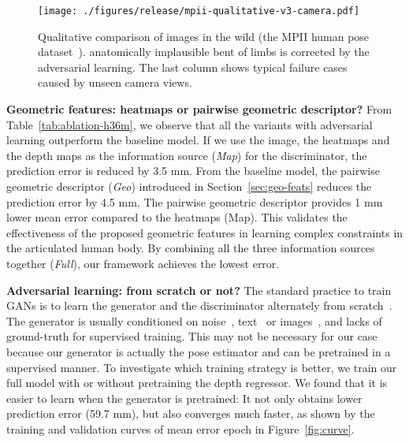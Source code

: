 \documentclass[10pt,twocolumn,letterpaper]{article}
\newcommand{\smalltitle}[1]{\vspace{0.2em}\noindent \textbf{{#1}}}
\begin{document}
\begin{figure*}[t]
	\begin{center}
		\texttt{[image: ./figures/release/mpii-qualitative-v3-camera.pdf]}
	\end{center}
	\vspace{-1em}
	\caption{Qualitative comparison of images in the wild (\ie the MPII human pose dataset~\cite{andriluka20142d}). 
		anatomically implausible bent of limbs is corrected by the adversarial learning. 
		The last column shows typical failure cases caused by unseen camera views. 
	}
	\vspace{-1em}
	\label{fig:mpii}
\end{figure*}

\smalltitle{Geometric features: heatmaps or pairwise geometric descriptor?} 
From Table~\ref{tab:ablation-h36m}, we observe that all the variants with adversarial learning outperform the baseline model. 
If we use the image, the heatmaps and the depth maps as the information source (\textit{Map}) for the discriminator, the prediction error is reduced by 3.5 mm. 
From the baseline model, the pairwise geometric descriptor (\textit{Geo}) introduced in Section~\ref{sec:geo-feats} reduces the prediction error by 4.5 mm. The pairwise geometric descriptor provides 1 mm lower mean error compared to the heatmaps (Map).  
This validates the effectiveness of the proposed geometric features in learning complex constraints in the articulated human body. 
By combining all the three information sources together (\textit{Full}), our framework achieves the lowest error.









\smalltitle{Adversarial learning: from scratch or not? }
The standard practice to train GANs is to learn the generator and the discriminator alternately from scratch~\cite{goodfellow2014generative,radford2015unsupervised,vondrick2016generating,zhu2017unpaired}. 
The generator is usually conditioned on noise~\cite{radford2015unsupervised}, text~\cite{zhang2016stackgan} or images~\cite{zhu2017unpaired}, and lacks of ground-truth for supervised training. 
This may not be necessary for our case because our generator is actually the pose estimator and can be pretrained in a supervised manner. 
To investigate which training strategy is better, we train our full model with or without pretraining the depth regressor. 
We found that it is easier to learn when the generator is pretrained: It not only obtains lower prediction error (59.7  mm), but also converges much faster, as shown by the training and validation curves of mean error \vs epoch in Figure~\ref{fig:curve}. 
\end{document}
